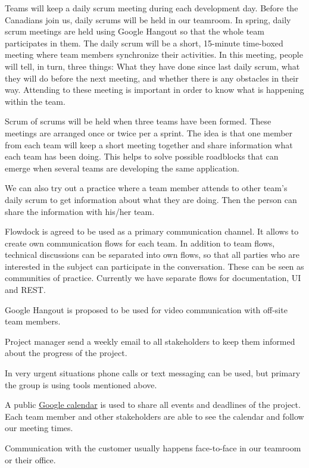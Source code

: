 Teams will keep a daily scrum meeting during each development day. Before the
Canadians join us, daily scrums will be held in our teamroom. In spring, daily
scrum meetings are held using Google Hangout so that the whole team participates
in them. The daily scrum will be a short, 15-minute time-boxed meeting where
team members synchronize their activities. In this meeting, people will tell, in
turn, three things: What they have done since last daily scrum, what they will
do before the next meeting, and whether there is any obstacles in their way.
Attending to these meeting is important in order to know what is happening
within the team.

Scrum of scrums will be held when three teams have been formed. These meetings
are arranged once or twice per a sprint. The idea is that one member from each team
will keep a short meeting together and share information what each team has been
doing. This helps to solve possible roadblocks that can emerge when several
teams are developing the same application.

We can also try out a practice where a team member attends to other team's daily
scrum to get information about what they are doing. Then the person can share
the information with his/her team.

Flowdock is agreed to be used as a primary communication channel. It allows to
create own communication flows for each team. In addition to team flows,
technical discussions can be separated into own flows, so that all parties who
are interested in the subject can participate in the conversation. These can be
seen as communities of practice. Currently we have separate flows for
documentation, UI and REST.

Google Hangout is proposed to be used for video communication with off-site team
members.

Project manager send a weekly email to all stakeholders to keep them informed
about the progress of the project.

In very urgent situations phone calls or text messaging can be used, but primary
the group is using tools mentioned above.

A public \href{http://tinyurl.com/mobilefant}{Google calendar} is used to share
all events and deadlines of the project. Each team member and other stakeholders
are able to see the calendar and follow our meeting times.

Communication with the customer usually happens face-to-face in our teamroom or
their office.

